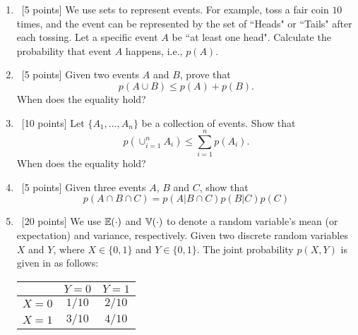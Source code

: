 \documentclass[12pt, fullpage,letterpaper]{article}
\begin{document}
%
\begin{enumerate}
\item~[5 points] We use sets to represent events. For example, toss a fair coin $10$ times, and the event can be represented by the set of ``Heads" or ``Tails" after each tossing. Let a specific event $A$ be ``at least one head". Calculate the probability that event $A$ happens, i.e., $p(A)$.
\item~[5 points] Given two events $A$ and $B$, prove that 
\[
p(A \cup B) \le p(A) + p(B).
\]
When does the equality hold?
\item~[10 points] Let $\{A_1, \ldots, A_n\}$ be a collection of events. Show that
\[
p(\cup_{i=1}^n A_i) \le \sum_{i=1}^n p(A_i).
\]
When does the equality hold?
\item~[5 points] Given three events $A$, $B$ and $C$, show that
\[
p(A\cap B\cap C) = p(A|B\cap C)p(B|C)p(C)
\]
\item~[20 points]  We use $\mathbb{E}(\cdot)$ and $\mathbb{V}(\cdot)$ to denote a random variable's mean (or expectation) and variance, respectively. Given two discrete random variables $X$ and $Y$, where $X \in \{0, 1\}$ and $Y \in \{0,1\}$. The joint probability $p(X,Y)$ is given in as follows:
\begin{table}[h]
        \centering
        \begin{tabular}{ccc}
        \hline\hline
         & $Y=0$ & $Y=1$ \\ \hline
         $X=0$ & $1/10$ & $2/10$ \\ \hline
         $X=1$  & $3/10$ & $4/10$ \\ \hline\hline
        \end{tabular}
        \end{table}
	

\end{enumerate}
\end{document}
